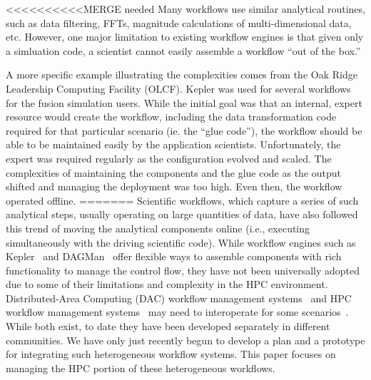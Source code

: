 \documentclass[conference]{IEEEtran}
\begin{document}
<<<<<<<<<<MERGE needed
Many workflows use similar analytical routines, such as data
filtering, FFTs, magnitude calculations of multi-dimensional data, etc.
However, 
one major limitation to existing workflow engines is that
given only a simluation code, a scientist cannot easily
assemble a workflow ``out of the box.''


A more specific example illustrating the complexities comes from the Oak Ridge
Leadership Computing Facility (OLCF).  Kepler was used for several workflows
for the fusion simulation users.  While the initial goal was that an internal,
expert resource would create the workflow,
including the data transformation code required
for that particular scenario (ie. the ``glue code''),
the workflow should
be able to be maintained easily by the application scientists. Unfortunately,
the expert was required regularly as the configuration evolved and scaled.
The complexities of maintaining the components and the glue code as the output
shifted and managing the deployment was too high.
Even then, the workflow operated offline.
=======
Scientific workflows, which capture a series of such analytical steps, usually
operating on large quantities of data, have also followed this trend of moving
the analytical components online (i.e., executing simultaneously with the driving
scientific code). While workflow engines such as
Kepler~\cite{bertram:2006:kepler} and DAGMan~\cite{Malewicz:2006:dagman} offer
flexible ways to assemble components with rich functionality to manage the
control flow, they have not been universally adopted due to some of their
limitations and complexity in the HPC environment.  Distributed-Area Computing
(DAC) workflow management
systems~\cite{tejedor:2015:pycompss,deelman:2015:pegasus} and HPC workflow
management systems~\cite{dorier:2015:in-situ-lessons} may need to interoperate
for some scenarios~\cite{deelman:2015:workflows-report}. While both exist, to
date they have been developed separately in different communities. We have only
just recently begun to develop a plan and a prototype for integrating such
heterogeneous workflow systems. This paper focuses on managing the HPC portion of
these heterogeneous workflows.

\end{document}
